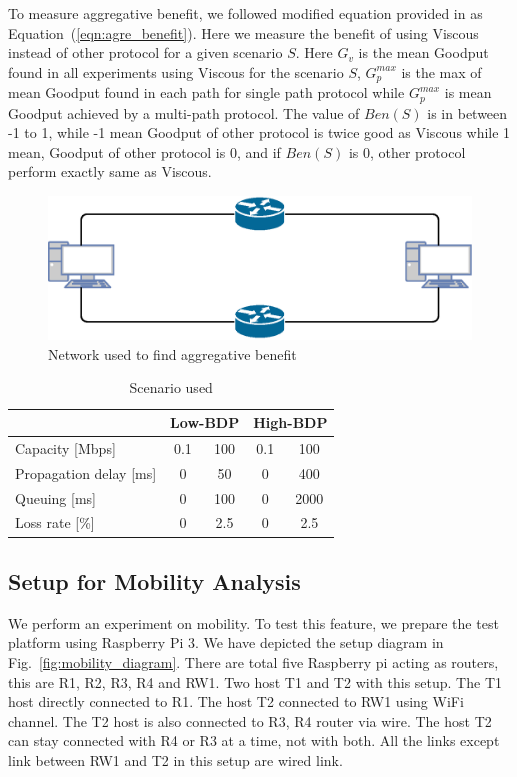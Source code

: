 To measure aggregative benefit, we followed modified equation provided in \cite{Kaspar:2012:MAH:2206765.2206770,Paasch:mptcp:compare,mpquic-measure}
as Equation~(\ref{eqn:agre_benefit}). Here we measure the benefit of using Viscous instead of other protocol for a given scenario $S$. Here $G_v$ is the mean Goodput found in all experiments using Viscous for the scenario $S$, $G_p^{max}$ is the max of mean Goodput found in each path for single path protocol while $G_p^{max}$ is mean Goodput achieved by a multi-path protocol. The value of $Ben(S)$ is in between -1 to 1, while -1 mean Goodput of other protocol is twice good as Viscous while 1 mean, Goodput of other protocol is 0, and if $Ben(S)$ is 0, other protocol perform exactly same as Viscous.

\begin{figure}
	\centering
	\includegraphics[width=\linewidth]{img/aggregation.eps}
	\caption{\label{fig:aggregation_dia}Network used to find aggregative benefit}
\end{figure}

\begin{table}[h]
	\centering
	\begin{tabular}{l||c|c||c|c}
		& \multicolumn{2}{c||}{Low-BDP} & \multicolumn{2}{c}{High-BDP}\\
		\hline
		\hline
		Capacity [Mbps] & 0.1 & 100 & 0.1 & 100 \\
		\hline
		Propagation delay [ms] & 0 & 50 & 0 & 400 \\
		\hline
		Queuing [ms] & 0 & 100 & 0 & 2000 \\
		\hline
		Loss rate [\%] & 0 & 2.5 & 0 & 2.5 \\
	\end{tabular}
	\caption{\label{tbl:noloss_param}Scenario used}
\end{table}

\subsection{Setup for Mobility Analysis}
We perform an experiment on mobility. To test this feature, we prepare the test platform using Raspberry Pi 3. We have depicted the setup diagram in Fig.~\ref{fig:mobility_diagram}. There are total five Raspberry pi acting as routers, this are R1, R2, R3, R4 and RW1. Two host T1 and T2 with this setup. The T1 host directly connected to R1. The host T2 connected to RW1 using WiFi channel. The T2 host is also connected to R3, R4 router via wire. The host T2 can stay connected with R4 or R3 at a time, not with both. All the links except link between RW1 and T2 in this setup are wired link.

